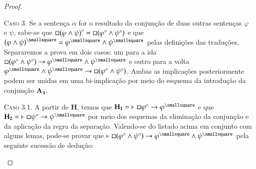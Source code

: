\begin{theorem}
\begin{proof}
            \begin{case}
                \textsc{Caso 3.}
                Se a sentença $\alpha$ for o resultado da conjunção de duas outras sentenças $\varphi$ e $\psi$, sabe-se que $\mathord{\square}{(\varphi\wedge\psi)}^\circ=\mathord{\square}(\varphi^\circ\wedge\psi^\circ)$ e que ${(\varphi\wedge\psi)}^\smallsquare=\varphi^\smallsquare\wedge\psi^\smallsquare$ pelas definições das traduções.
                Separaremos a prova em dois casos: um para a ida $\nec(\varphi^\circ\wedge\psi^\circ)\to\varphi^\smallsquare\wedge\psi^\smallsquare$ e outro para a volta $\varphi^\smallsquare\wedge\psi^\smallsquare\to\nec(\varphi^\circ\wedge\psi^\circ)$. Ambas as implicações posteriormente podem ser unidas em uma bi-implicação por meio do esquema da introdução da conjunção \hyperref[MA3]{$\mathbf{A_3}$}.
            \end{case}

                \begin{subcase}
                    \textsc{Caso 3.1.}
                    A partir de $\mathbf{H}$, temos que $\mathbf{H_1}={\entails\nec\varphi^\circ\to\varphi^\smallsquare}$ e que $\mathbf{H_2}={\entails\nec\psi^\circ\to\psi^\smallsquare}$ por meio dos esquemas da eliminação da conjunção e da aplicação da regra da separação.
                    Valendo-se do listado acima em conjunto com alguns lemas, pode-se provar que $\entails\nec(\varphi^\circ\wedge\psi^\circ)\to\varphi^\smallsquare\wedge\psi^\smallsquare$ pela seguinte sucessão de dedução:


\end{subcase}
\end{proof}
\end{theorem}
